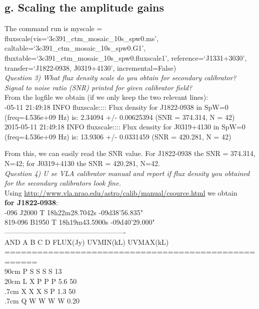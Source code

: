 \documentclass[12pt, a4paper]{article}
\begin{document}
\subsection{g. Scaling the amplitude gains}
The command run is {\tiny myscale = fluxscale(vis=`3c391\_ctm\_mosaic\_10s\_spw0.ms', caltable=`3c391\_ctm\_mosaic\_10s\_spw0.G1', fluxtable=`3c391\_ctm\_mosaic\_10s\_spw0.fluxscale1', reference=\lbrack`J1331+3030'\rbrack, transfer=\lbrack`J1822-0938, J0319+4130'\rbrack, incremental=False) } \\
\noindent \textit{Question 3) What flux density scale do you obtain for secondary calibrator? Signal to noise ratio (SNR) printed for given calibrator field? } \\
From the logfile we obtain (if we only keep the two relevant lines): \\

{\tiny {}-05-11 21:49:18     INFO    fluxscale::::    Flux density for J1822-0938 in SpW=0 (freq=4.536e+09 Hz) is: 2.34094 +/- 0.00625394 (SNR = 374.314, N = 42) \\
2015-05-11 21:49:18     INFO    fluxscale::::    Flux density for J0319+4130 in SpW=0 (freq=4.536e+09 Hz) is: 13.9306 +/- 0.0331459 (SNR = 420.281, N = 42) \\ }

From this, we can easily read the SNR value. For J1822-0938 the SNR = 374.314, N=42; for J0319+4130 the SNR = 420.281, N=42. \\

\noindent \textit{Question 4) U se VLA calibrator manual and report if flux density you obtained for the secondary calibrators look fine.} \\

\noindent Using \url{http://www.vla.nrao.edu/astro/calib/manual/csource.html} we obtain \\
\noindent \textbf{for J1822-0938}: \\
{\tiny {}-096   J2000  T 18h22m28.7042s   -09d38'56.835" \\
819-096   B1950  T 18h19m43.5900s   -09d40'29.000" \\
---------------------------------------------------- \\
AND        A B C D    FLUX(Jy)    UVMIN(kL)  UVMAX(kL) \\
==================================================== \\
90cm    P  S S S S         13 \\
20cm    L  X P P P        5.6                       50 \\
.7cm    X  X X S P        1.3                       50 \\
.7cm    Q  W W W W       0.20 \\ }
\end{document}
